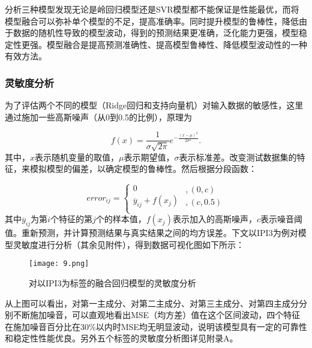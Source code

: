 分析三种模型发现无论是岭回归模型还是SVR模型都不能保证是性能最优，而将模型融合可以弥补单个模型的不足，提高准确率。同时提升模型的鲁棒性，降低由于数据的随机性导致的模型波动，得到的预测结果更准确，泛化能力更强，模型稳定性更强。模型融合是提高预测准确性、提高模型鲁棒性、降低模型波动性的一种有效方法。



\subsubsection{灵敏度分析}

为了评估两个不同的模型（Ridge回归和支持向量机）对输入数据的敏感性，这里通过施加一些高斯噪声（从0到0.5的比例），原理为

\begin{equation}
    f\left( x \right)=\frac{1}{\sigma \sqrt{2\pi }}{{e}^{-\frac{{{\left( x-\mu  \right)}^{2}}}{2{{\sigma }^{2}}}}}.
\end{equation}
其中，$x$表示随机变量的取值，$\mu$表示期望值，$\sigma$表示标准差。改变测试数据集的特征，来模拟模型的偏差，以确定模型的鲁棒性。然后根据分段函数：

\begin{equation}
    erro{{r}_{ij}}=\left\{ \begin{matrix}
       0  \\
       {{\overline{y}}_{ij}}+f({{x}_{j}})  \\
    \end{matrix} \right.\begin{matrix}
       ,\left( 0,c \right)  \\
       ,\left( c,0.5 \right)  \\
    \end{matrix}
\end{equation}
其中$\overline{y}_{ij}$为第$i$个特征的第$j$个的样本值，$f({{x}_{j}})$表示加入的高斯噪声，$c$表示噪音阈值。重新预测，并计算预测结果与真实结果之间的均方误差。下文以IPI3为例对模型灵敏度进行分析（其余见附件），得到数据可视化图如下所示：

\begin{figure}[H] %
	\centering %
	\texttt{[image: 9.png]} 
	\caption{对以IPI3为标签的融合回归模型的灵敏度分析} 
	\label{Fig.main9} 
\end{figure}

从上图可以看出，对第一主成分、对第二主成分、对第三主成分、对第四主成分分别不断施加噪音，可以直观地看出MSE（均方差）值在这个区间波动，四个特征在施加噪音百分比在30\%以内时MSE均无明显波动，说明该模型具有一定的可靠性和稳定性性能优良。另外五个标签的灵敏度分析图详见附录A。
